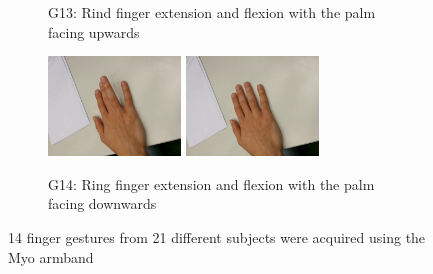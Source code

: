 \begin{figure}
\begin{subfigure}[t]{0.5\linewidth}
  \caption{G13: Rind finger extension and flexion with the palm facing upwards}
  \end{subfigure}
  \hspace*{\fill}
  \begin{subfigure}[t]{0.5\linewidth}
  \includegraphics[width=100pt]{figures/ext_wedding2}
  \includegraphics[width=100pt]{figures/flx_wedding2}
  \caption{G14: Ring finger extension and flexion with the palm facing downwards}
  \end{subfigure}\par\medskip
\caption{14 finger gestures from 21 different subjects were acquired using the Myo armband}
\end{figure}